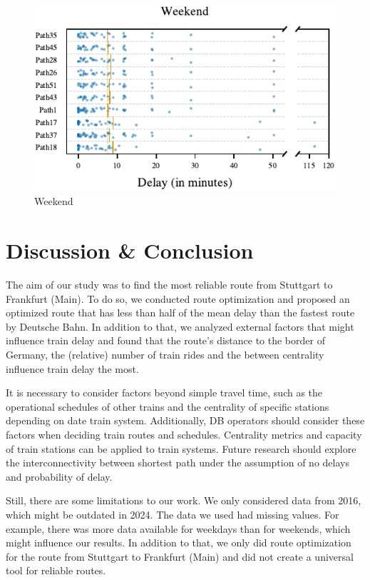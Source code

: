 \documentclass{article}
\theoremstyle{plain}
\theoremstyle{definition}
\theoremstyle{remark}
\begin{document}
\begin{figure} 
    \includegraphics{fig/plot_FP_02_Weekend.pdf}
    \caption{Weekend}
\end{figure} 

\section{Discussion \& Conclusion}\label{sec:conclusion}

The aim of our study was to find the most reliable route from Stuttgart to Frankfurt (Main). To do so, we conducted route optimization and proposed an optimized route that has less than half of the mean delay than the fastest route by Deutsche Bahn. In addition to that, we analyzed external factors that might influence train delay and found that the route's distance to the border of Germany, the (relative) number of train rides and the between centrality influence train delay the most.

It is necessary to consider factors beyond simple travel time, such as the operational schedules of other trains and the centrality of specific stations depending on date train system. Additionally, DB operators should consider these factors when deciding train routes and schedules. Centrality metrics and capacity of train stations can be applied to train systems. Future research should explore the interconnectivity between shortest path under the assumption of no delays and probability of delay.

Still, there are some limitations to our work. We only considered data from 2016, which might be outdated in 2024. The data we used had missing values. For example, there was more data available for weekdays than for weekends, which might influence our results. In addition to that, we only did route optimization for the route from Stuttgart to Frankfurt (Main) and did not create a universal tool for reliable routes.
\end{document}
